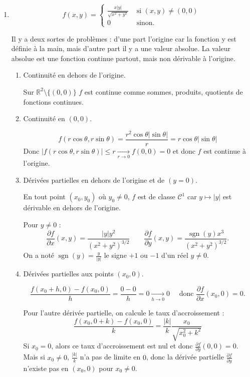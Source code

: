 \documentclass[11pt,a4paper]{article}
\newcommand{\Rr}{\mathbb{R}} \newcommand{\R}{\mathbb{R}}
\renewcommand{\le}{\leqslant} \renewcommand{\leq}{\leqslant}
\theoremstyle{exostyle}
\begin{document}
\begin{enumerate}
	
	
	\item $$
	f(x,y)=\left\{
	\begin{array}{cc}
		\frac{x|y|}{\sqrt{x^2+y^2}} & \mbox{ si }(x,y) \neq (0,0) \\
		0 & \mbox{ sinon. }
	\end{array}
	\right .
	$$  
	
	Il y a deux sortes de problèmes : d'une part l'origine car la fonction y est définie \og{}à la main\fg{}, mais d'autre part il y a une valeur absolue. La valeur absolue est une fonction continue partout, mais non dérivable à l'origine.
	
	\begin{enumerate}
		
		\item Continuité en dehors de l'origine.
		
		Sur $\Rr^2 \setminus \{(0,0)\}$ $f$ est continue comme sommes, produits, quotients de fonctions continues.
		
		
		\item Continuité en $(0,0)$.
		
		\[
		f(r\cos\theta,r\sin\theta) = \frac{r^2\cos\theta|\sin\theta|}{r} = r\cos\theta|\sin\theta|
		\]
		Donc $|f(r\cos\theta,r\sin\theta)| \le r \xrightarrow[r\to0]{} f(0,0)=0$ et donc $f$ est continue à l'origine.
		
		\item Dérivées partielles en dehors de l'origine et de $(y=0)$.
		
		En tout point $(x_0,y_0)$ où $y_0 \neq 0$, $f$ est de classe $\mathcal{C}^1$ car $y \mapsto |y|$ est dérivable en dehors de l'origine.
		
		Pour \(y \neq 0\) :
		\[
		\frac{\partial f}{\partial x}(x, y) = \frac{|y| y^2}{(x^2 + y^2)^{3/2}} 
		\qquad 
		\frac{\partial f}{\partial y}(x, y) = \frac{ \operatorname{sgn}(y)x^3}{(x^2 + y^2)^{3/2}}.
		\]
		On a noté $\operatorname{sgn}(y) = \frac{y}{|y|}$ le signe $+1$ ou $-1$ d'un réel $y\neq 0$.
		
		\item Dérivées partielles aux points $(x_0,0)$.
		
		\[
		\frac{f(x_0+h, 0) - f(x_0, 0)}{h}
		= \frac{0 - 0}{h}
		= 0 \xrightarrow[h\to0]{} 0 \quad\text{ donc } \frac{\partial f}{\partial x}(x_0,0) = 0.
		\]
		
		Pour l'autre dérivée partielle, on calcule le taux d'accroissement :
		\[
		\frac{f(x_0, 0+k) - f(x_0, 0)}{k}
		= \frac{|k|}{k}\frac{x_0}{\sqrt{x_0^2+k^2}}
		\]
		Si $x_0=0$, alors ce taux d'accroissement est nul et donc $\frac{\partial f}{\partial y}(0,0) = 0$.
		Mais si $x_0 \neq 0$, $\frac{|k|}{k}$ n'a pas de limite en $0$, donc la dérivée partielle $\frac{\partial f}{\partial y}$ n'existe pas en $(x_0,0)$ pour $x_0\neq0$.
		

\end{enumerate}
\end{enumerate}
\end{document}
